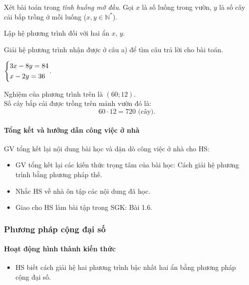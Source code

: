 \begin{vandung}
    Xét bài toán trong \textit{tình huống mở đầu}. Gọi $x$ là số luống trong vườn, $y$ là số cây cải bắp trồng ở mỗi luống ($x, y \in \mathbb{N}^*$).
    \begin{listEX}
        \item Lập hệ phương trình đối với hai ẩn $x$, $y$.
        \item Giải hệ phương trình nhận được ở câu a) để tìm câu trả lời cho bài toán.
    \end{listEX}
    \doicot
    \huongdan
    \begin{listEX}
        \item $\left\{\begin{aligned}&3x-8y=84\\&x-2y=36\end{aligned}\right.$.
        \item Nghiệm của phương trình trên là $(60;12)$.\\
        Số cây bắp cải được trồng trên mảnh vườn đó là:
        $$60\cdot12=720\text{ (cây)}.$$
    \end{listEX}
\end{vandung}

\paragraph{Tổng kết và hướng dẫn công việc ở nhà}

GV tổng kết lại nội dung bài học và dặn dò công việc ở nhà cho HS:

\begin{itemize}
    \item  GV tổng kết lại các kiến thức trọng tâm của bài học: Cách giải hệ phương trình bằng phương pháp thế. 
    \item Nhắc HS về nhà ôn tập các nội dung đã học. 
    \item Giao cho HS làm bài tập trong SGK: Bài 1.6.
\end{itemize}

\subsubsection{Phương pháp cộng đại số}

\paragraph{Hoạt động hình thành kiến thức}

\muctieu

\begin{itemize}
    \item HS biết cách giải hệ hai phương trình bậc nhất hai ẩn bằng phương pháp cộng đại số. 
\end{itemize}

